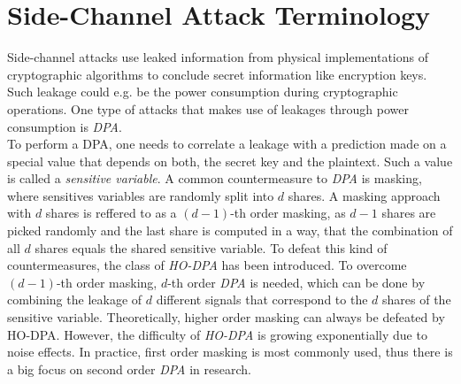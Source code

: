 \section{Side-Channel Attack Terminology}
Side-channel attacks use leaked information from physical implementations of cryptographic algorithms to conclude secret information like encryption keys. Such leakage could e.g. be the power consumption during cryptographic operations. One type of attacks that makes use of leakages through power consumption is \textit{\ac{DPA}}.\\
To perform a DPA, one needs to correlate a leakage with a prediction made on a special value that depends on both, the secret key and the plaintext. Such a value is called a \textit{sensitive variable}. A common countermeasure to \textit{\ac{DPA}} is masking, where sensitives variables are randomly split into \(d\) shares. A masking approach with \(d\) shares is reffered to as a \((d-1)\)-th order masking, as \(d-1\) shares are picked randomly and the last share is computed in a way, that the combination of all \(d\) shares equals the shared sensitive variable. To defeat this kind of countermeasures, the class of \textit{\ac{HO-DPA}} has been introduced. To overcome \((d-1)\)-th order masking, \(d\)-th order \textit{\ac{DPA}} is needed, which can be done by combining the leakage of \(d\) different signals that correspond to the \(d\) shares of the sensitive variable. Theoretically, higher order masking can always be defeated by HO-DPA. However, the difficulty of \textit{\ac{HO-DPA}} is growing exponentially due to noise effects. In practice, first order masking is most commonly used, thus there is a big focus on second order \textit{\ac{DPA}} in research.